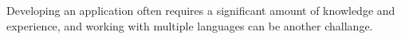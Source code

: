 
\chapter{}%
\label{ch:inleiding}



\section{}%
\label{sec:probleemstelling}


Developing an application often requires a significant amount of knowledge and experience, and working with multiple languages can be another challange. 

